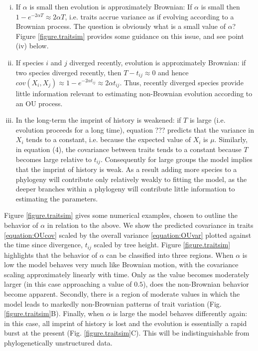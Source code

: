 \documentclass[a4paper,12pt]{article}
\begin{document}
\begin{enumerate}[(i)]
  
  \item If $\alpha$ is small then evolution is approximately Brownian: If $\alpha$ is small then $1 - e^{-2\alpha T} \approx 2\alpha T$, i.e. traits accrue variance as if evolving according to a Brownian process. The question is obviously what is a small value of $\alpha$? Figure \ref{figure.traitsim} provides some guidance on this issue, and see point (iv) below.\\ 

  \item If species $i$ and $j$ diverged recently, evolution is approximately Brownian: if two species diverged recently, then $T - t_{ij} \approx 0$ and hence $cov(X_i, X_j) \approx 1 - e^{-2\alpha t_{ij}} \approx 2\alpha t_{ij}$. Thus, recently diverged species provide little information relevant to estimating non-Brownian evolution according to an OU process. \\ 

  \item In the long-term the imprint of history is weakened: if $T$ is large (i.e. evolution proceeds for a long time), equation ??? predicts that the variance in $X_i$ tends to a constant, i.e. because the expected value of $X_i$ is $\mu$. Similarly, in equation (4), the covariance between traits tends to a constant because $T$ becomes large relative to $t_{ij}$. Consequently for large groups the model implies that the imprint of history is weak. As a result adding more species to a phylogeny will contribute only relatively weakly to fitting the model, as the deeper branches within a phylogeny will contribute little information to estimating the parameters.\\

\end{enumerate}

Figure \ref{figure.traitsim} gives some numerical examples, chosen to outline the behavior of $\alpha$ in relation to the above. We show the predicted covariance in traits \ref{equation:OUcov} scaled by the overall variance \ref{equation:OUvar} plotted against the time since divergence, $t_{ij}$ scaled by tree height. Figure \ref{figure.traitsim} highlights that the behavior of $\alpha$ can be classified into three regions. When $\alpha$ is low the model behaves very much like Brownian motion, with the covariance scaling approximately linearly with time. Only as the value becomes moderately larger (in this case approaching a value of $0.5$), does the non-Brownian behavior become apparent. Secondly, there is a region of moderate values in which the model leads to markedly non-Brownian patterns of trait variation (Fig. \ref{figure.traitsim}B).  Finally, when $\alpha$ is large the model behaves differently again: in this case, all imprint of history is lost and the evolution is essentially a rapid burst at the present (Fig. \ref{figure.traitsim}C). This will be indistinguishable from phylogenetically unstructured data.  
\end{document}
